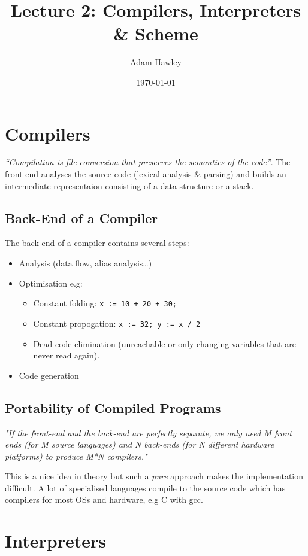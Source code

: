 \documentclass[11pt]{article}
\author{Adam Hawley}
\date{\today}
\title{Lecture 2: Compilers, Interpreters \& Scheme}
\begin{document}
\maketitle
\tableofcontents


\section{Compilers}
\label{sec:orgd4f5193}
\emph{``Compilation is file conversion that preserves the semantics of the code''}.
The front end analyses the source code (lexical analysis \& parsing) and builds an intermediate representaion consisting of a data structure or a stack.
\subsection{Back-End of a Compiler}
\label{sec:org3233bb7}
The back-end of a compiler contains several steps:
\begin{itemize}
\item Analysis (data flow, alias analysis\ldots{})
\item Optimisation e.g:
\begin{itemize}
\item Constant folding: \texttt{x := 10 + 20 + 30;}
\item Constant propogation: \texttt{x := 32; y := x / 2}
\item Dead code elimination (unreachable or only changing variables that are never read again).
\end{itemize}
\item Code generation
\end{itemize}
\subsection{Portability of Compiled Programs}
\label{sec:org8f907b3}
\emph{"If the front-end and the back-end are perfectly separate, we only need M front ends (for M source languages) and N back-ends (for N different hardware platforms) to produce M*N compilers."}

This is a nice idea in theory but such a \emph{pure} approach makes the implementation difficult.
A lot of specialised languages compile to the source code which has compilers for most OSs and hardware, e.g C with gcc.
\section{Interpreters}
\label{sec:orgf39c024}
\end{document}
